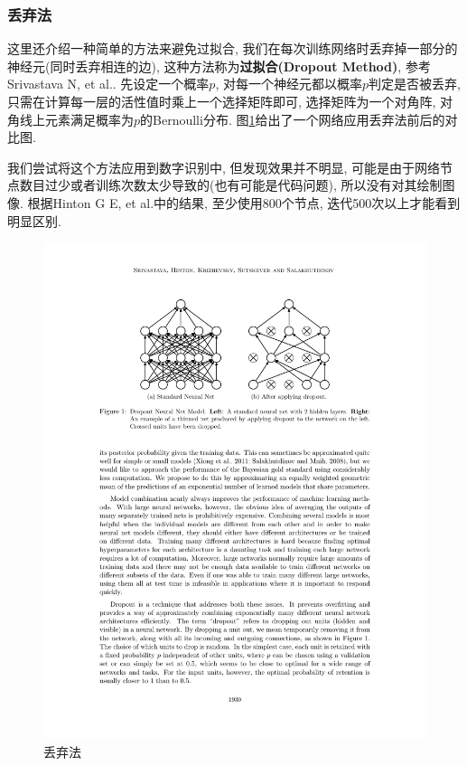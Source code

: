 \documentclass[12pt, a4paper, oneside]{ctexart}
\begin{document}
\subsubsection{丢弃法}
这里还介绍一种简单的方法来避免过拟合, 我们在每次训练网络时丢弃掉一部分的神经元(同时丢弃相连的边), 这种方法称为\textbf{过拟合(Dropout Method)}, 参考Srivastava N, et al.\cite{ref-dropout}. 先设定一个概率$p$, 对每一个神经元都以概率$p$判定是否被丢弃, 只需在计算每一层的活性值时乘上一个选择矩阵即可, 选择矩阵为一个对角阵, 对角线上元素满足概率为$p$的Bernoulli分布. 图\ref{figure-dropout}给出了一个网络应用丢弃法前后的对比图. 

我们尝试将这个方法应用到数字识别中, 但发现效果并不明显, 可能是由于网络节点数目过少或者训练次数太少导致的(也有可能是代码问题), 所以没有对其绘制图像. 根据Hinton G E, et al.\cite{ref-dropout_example}中的结果, 至少使用$800$个节点, 迭代500次以上才能看到明显区别.

\begin{figure}[htbp]
    \centering
    \includegraphics[scale=1]{dropout1.pdf}
    \caption{丢弃法\protect\footnotemark[1]}
    \label{figure-dropout}
\end{figure}
\end{document}
